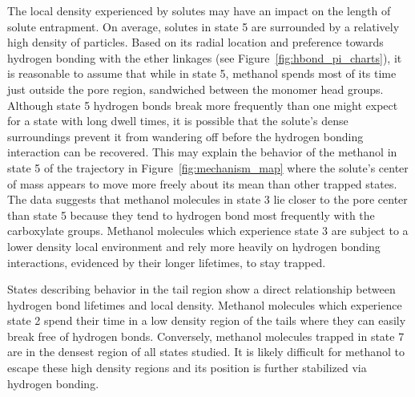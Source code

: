 \documentclass{article}
\begin{document}
  The local density experienced by solutes may have an impact on the length of solute 
  entrapment. On average, solutes in state 5 are surrounded by a relatively high density
  of particles. Based on its radial location and preference towards hydrogen bonding
  with the ether linkages (see Figure~\ref{fig:hbond_pi_charts}), it is reasonable to
  assume that while in state 5, methanol spends most of its time just outside the 
  pore region, sandwiched between the monomer head groups. Although state 5 hydrogen
  bonds break more frequently than one might expect for a state with long dwell times,
  it is possible that the solute's dense surroundings prevent it from wandering off 
  before the hydrogen bonding interaction can be recovered. This may explain the 
  behavior of the methanol in state 5 of the trajectory in Figure~\ref{fig:mechanism_map}
  where the solute's center of mass appears to move more freely about its mean than 
  other trapped states. The data suggests that methanol molecules in state 3 lie closer
  to the pore center than state 5 because they tend to hydrogen bond most frequently 
  with the carboxylate groups. Methanol molecules which experience state 3 are subject 
  to a lower density local environment and rely more heavily on hydrogen bonding interactions, 
  evidenced by their longer lifetimes, to stay trapped.
  
  States describing behavior in the tail region show a direct relationship between 
  hydrogen bond lifetimes and local density. Methanol molecules which experience state 2 
  spend their time in a low density region of the tails where they can easily break free
  of hydrogen bonds. Conversely, methanol molecules trapped in state 7 are in the densest 
  region of all states studied. It is likely difficult for methanol to escape these high 
  density regions and its position is further stabilized via hydrogen bonding.
  
\end{document}
